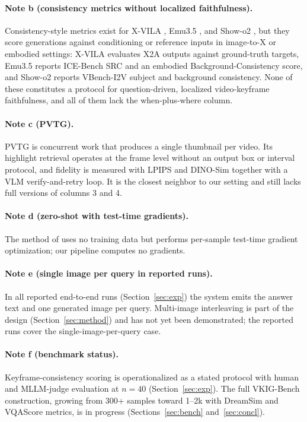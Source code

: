 \documentclass[10pt]{article}
\begin{document}
\paragraph{Note b (consistency metrics without localized faithfulness).}
Consistency-style metrics exist for X-VILA \citep{xvila2405}, Emu3.5 \citep{emu352510}, and Show-o2 \citep{showo22506}, but they score generations against conditioning or reference inputs in image-to-X or embodied settings: X-VILA evaluates X2A outputs against ground-truth targets, Emu3.5 reports ICE-Bench SRC and an embodied Background-Consistency score, and Show-o2 reports VBench-I2V subject and background consistency. None of these constitutes a protocol for question-driven, localized video-keyframe faithfulness, and all of them lack the when-plus-where column.

\paragraph{Note c (PVTG).}
PVTG \citep{pvtg2607} is concurrent work that produces a single thumbnail per video. Its highlight retrieval operates at the frame level without an output box or interval protocol, and fidelity is measured with LPIPS and DINO-Sim together with a VLM verify-and-retry loop. It is the closest neighbor to our setting and still lacks full versions of columns 3 and 4.

\paragraph{Note d (zero-shot with test-time gradients).}
The method of \citet{zeroshotstvg2509} uses no training data but performs per-sample test-time gradient optimization; our pipeline computes no gradients.

\paragraph{Note e (single image per query in reported runs).}
In all reported end-to-end runs (Section~\ref{sec:exp}) the system emits the answer text and one generated image per query. Multi-image interleaving is part of the design (Section~\ref{sec:method}) and has not yet been demonstrated; the reported runs cover the single-image-per-query case.

\paragraph{Note f (benchmark status).}
Keyframe-consistency scoring is operationalized as a stated protocol with human and MLLM-judge evaluation at $n=40$ (Section~\ref{sec:exp}). The full VKIG-Bench construction, growing from 300+ samples toward 1--2k with DreamSim and VQAScore metrics, is in progress (Sections~\ref{sec:bench} and~\ref{sec:concl}).
\end{document}
